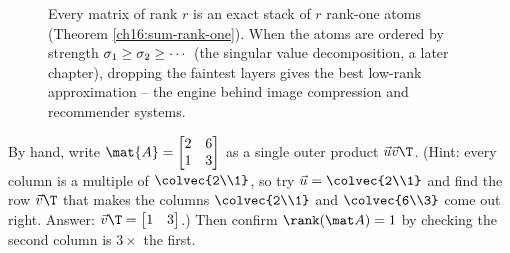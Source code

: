 \begin{figure}[H]
\centering
{}
\caption{Every matrix of rank $r$ is an exact stack of $r$ rank-one atoms
(Theorem \protect\ref{ch16:sum-rank-one}). When the atoms are ordered by strength
$\protect\sigma_1\ge\protect\sigma_2\ge\cdots$ (the singular value decomposition,
a later chapter), dropping the faintest layers gives the best low-rank
approximation -- the engine behind image compression and recommender systems.}
\label{ch16:atomstack}
\end{figure}

\begin{labbox}
By hand, write $\mat{A}=\begin{bmatrix}2 & 6 \\ 1 & 3\end{bmatrix}$ as a single
outer product $\vec{u}\vec{v}\T$. (Hint: every column is a multiple of
$\colvec{2\\1}$, so try $\vec{u}=\colvec{2\\1}$ and find the row $\vec{v}\T$ that
makes the columns $\colvec{2\\1}$ and $\colvec{6\\3}$ come out right. Answer:
$\vec{v}\T = \begin{bmatrix}1 & 3\end{bmatrix}$.) Then confirm $\rank(\mat A)=1$
by checking the second column is $3\times$ the first.
\end{labbox}

